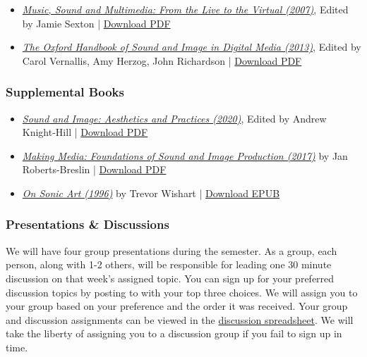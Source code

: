 \begin{itemize}
      \tightlist
      \item \emph{\href{https://books.google.com/books?id=j-iqBgAAQBAJ&newbks=1&newbks_redir=0&source=gbs_navlinks_s}{Music, Sound and Multimedia: From the Live to the Virtual (2007)}}, Edited by Jamie Sexton | \href{supplements/Music_Sound_and_Multimedia_-_From_the_Live_to_the_Virtual_(Music_and_the_Moving_Image)_(2008).pdf}{Download PDF}
      \item \emph{\href{https://books.google.com/books/about/The_Oxford_Handbook_of_Sound_and_Image_i.html?id=XWHSAQAAQBAJ}{The Oxford Handbook of Sound and Image in Digital Media (2013)}}, Edited by Carol Vernallis, Amy Herzog, John Richardson | \href{supplements/The_Oxford_Handbook_of_Sound_and_Image_in_Digital_Media_(2013).pdf}{Download PDF}
\end{itemize}

\subsubsection{Supplemental Books}

\begin{itemize}
      \tightlist
      \item \emph{\href{https://books.google.com/books/about/Sound_and_Image.html?id=-wpUzQEACAAJ}{Sound and Image: Aesthetics and Practices (2020)}}, Edited by Andrew Knight-Hill | \href{supplements/Sound_and_Image_-_Aesthetics_and_Practices_(Sound_Design)_(2020).pdf}{Download PDF}
      \item \emph{\href{https://books.google.com/books?id=aGYPEAAAQBAJ&newbks=1&newbks_redir=0&source=gbs_navlinks_s}{Making Media: Foundations of Sound and Image Production (2017)}} by Jan Roberts-Breslin | \href{supplements/Making_Media_-_Foundations_of_Sound_and_Image_Production_(2003).pdf}{Download PDF}
      \item \emph{\href{https://books.google.com/books?id=KbYyDQAAQBAJ&dq=On_Sonic_Art_(Contemporary_Music_Studies)_(2002)&source=gbs_navlinks_s}{On Sonic Art (1996)}} by Trevor Wishart | \href{supplements/On_Sonic_Art_(Contemporary_Music_Studies)_(2002).epub}{Download EPUB}
\end{itemize}

\subsubsection{Presentations \& Discussions}

We will have four group presentations during the semester. As a group, each person, along with 1-2 others, will be responsible for leading one 30 minute discussion on that week's assigned topic. You can sign up for your preferred discussion topics by posting to  with your top three choices. We will assign you to your group based on your preference and the order it was received. Your group and discussion assignments can be viewed in the \href{https://docs.google.com/spreadsheets/d/1Fw-DHUMtnCnlHasDcXCUGjx8n23QxS_RaPrshLq49R0/edit?usp=sharing}{discussion spreadsheet}. We will take the liberty of assigning you to a discussion group if you fail to sign up in time.

